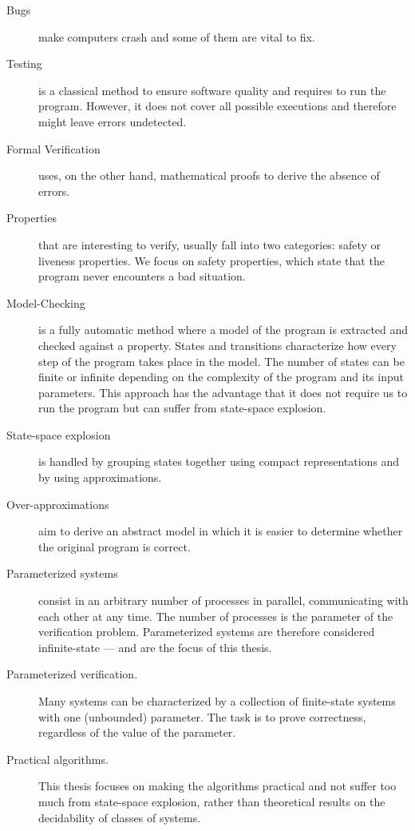 \begin{description}
\item[Bugs] make computers crash and some of them are vital to fix.
\item[Testing] is a classical method to ensure software quality and
  requires to run the program. However, it does not cover all possible
  executions and therefore might leave errors undetected.
\item[Formal Verification] uses, on the other hand, mathematical
  proofs to derive the absence of errors.
\item[Properties] that are interesting to verify, usually fall into
  two categories: safety or liveness properties. We focus on safety
  properties, which state that the program never encounters a bad
  situation.
\item[Model-Checking] is a fully automatic method where a model of the
  program is extracted and checked against a property.
  States and transitions characterize how every step of the program
  takes place in the model.
  The number of states can be finite or infinite depending on the
  complexity of the program and its input parameters.
  This approach has the advantage that it does not require us to run
  the program but can suffer from state-space explosion.
\item[State-space explosion] is handled by grouping states together
  using compact representations and by using approximations.
\item[Over-approximations] aim %
  to derive an abstract model in which it is easier %
  to determine whether the original program is correct.
\item[Parameterized systems] consist in an arbitrary number of
  processes in parallel, communicating with each other at any
  time. The number of processes is the parameter of the verification
  problem. Parameterized systems are therefore considered
  infinite-state --- and are the focus of this thesis.
\item[Parameterized verification.] Many systems can be characterized
  by a collection of finite-state systems with one (unbounded)
  parameter. The task is to prove correctness, regardless of the value
  of the parameter.
\item[Practical algorithms.] This thesis focuses on making the
  algorithms practical and not suffer too much from state-space
  explosion, rather than theoretical results on the decidability of
  classes of systems.
\end{description}
